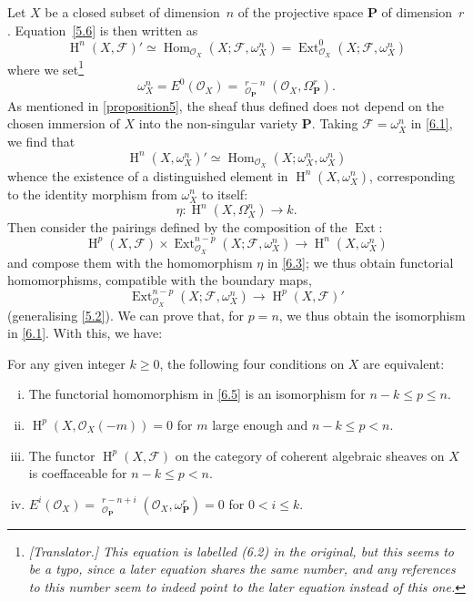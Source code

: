 \documentclass{article}
\theoremstyle{plain}
\newenvironment{theorem}[1]
  {\renewcommand\theinnercustomtheorem{#1}\innercustomtheorem}
  {\endinnercustomtheorem}
\theoremstyle{definition}
\newcommand{\sh}{\mathscr}
\newcommand{\bb}{\mathbf}
\renewcommand{\geq}{\geqslant}
\renewcommand{\leq}{\leqslant}
\DeclareMathOperator{\Ext}{Ext}
\DeclareMathOperator{\Hom}{Hom}
\DeclareMathOperator{\shExt}{\underline{Ext}}
\DeclareMathOperator{\HH}{H}
\newcommand{\oldpage}[1]{\marginpar{\footnotesize$\Big\vert$ \textit{p.~#1}}}
\begin{document}
Let $X$ be a closed subset of dimension~$n$ of the projective space $\bb{P}$ of dimension~$r$.
Equation~\cref{5.6} is then written as
\[
\label{6.1}
  \HH^n(X,\sh{F})'
  \simeq \Hom_{\sh{O}_X}(X;\sh{F},\omega_X^n)
  = \Ext_{\sh{O}_X}^0(X;\sh{F},\omega_X^n)
\tag{6.1}
\]
where we set\footnote{\emph{[Translator.] This equation is labelled (6.2) in the original, but this seems to be a typo, since a later equation shares the same number, and any references to this number seem to indeed point to the later equation instead of this one.}}
\[
  \omega_X^n = E^0(\sh{O}_X) = \shExt_{\sh{O}_\bb{P}}^{r-n}(\sh{O}_X,\Omega_\bb{P}^r).
\]
As mentioned in \cref{proposition5}, the sheaf thus defined does not depend on the chosen immersion of $X$ into the non-singular variety $\bb{P}$.
Taking $\sh{F}=\omega_X^n$ in \cref{6.1}, we find that
\[
\label{6.2}
  \HH^n(X,\omega_X^n)' \simeq \Hom_{\sh{O}_X}(X;\omega_X^n,\omega_X^n)
\tag{6.2}
\]
whence the existence of a distinguished element in $\HH^n(X,\omega_X^n)$, corresponding to the identity morphism from $\omega_X^n$ to itself:
\[
\label{6.3}
  \eta\colon \HH^n(X,\Omega_X^n) \to k.
\tag{6.3}
\]
\oldpage{149-18}
Then consider the pairings defined by the composition of the $\Ext$:
\[
\label{6.4}
  \HH^p(X,\sh{F}) \times \Ext_{\sh{O}_X}^{n-p}(X;\sh{F},\omega_X^n)
  \to \HH^n(X,\omega_X^n)
\tag{6.4}
\]
and compose them with the homomorphism $\eta$ in \cref{6.3}; we thus obtain functorial homomorphisms, compatible with the boundary maps,
\[
\label{6.5}
  \Ext_{\sh{O}_X}^{n-p}(X;\sh{F},\omega_X^n) \to \HH^p(X,\sh{F})'
\tag{6.5}
\]
(generalising \cref{5.2}).
We can prove that, for $p=n$, we thus obtain the isomorphism in \cref{6.1}.
With this, we have:

\begin{theorem}{3~bis}
\label{theorem3bis}
  For any given integer $k\geq0$, the following four conditions on $X$ are equivalent:
  \begin{enumerate}[i.]
    \item The functorial homomorphism in \cref{6.5} is an isomorphism for $n-k\leq p\leq n$.
    \item $\HH^p(X,\sh{O}_X(-m)) = 0$ for $m$ large enough and $n-k\leq p<n$.
    \item The functor $\HH^p(X,\sh{F})$ on the category of coherent algebraic sheaves on $X$ is coeffaceable for $n-k\leq p<n$.
    \item $E^i(\sh{O}_X) = \shExt_{\sh{O}_\bb{P}}^{r-n+i}(\sh{O}_X,\omega_\bb{P}^r) = 0$ for $0<i\leq k$.
  \end{enumerate}
\end{theorem}
\end{document}
